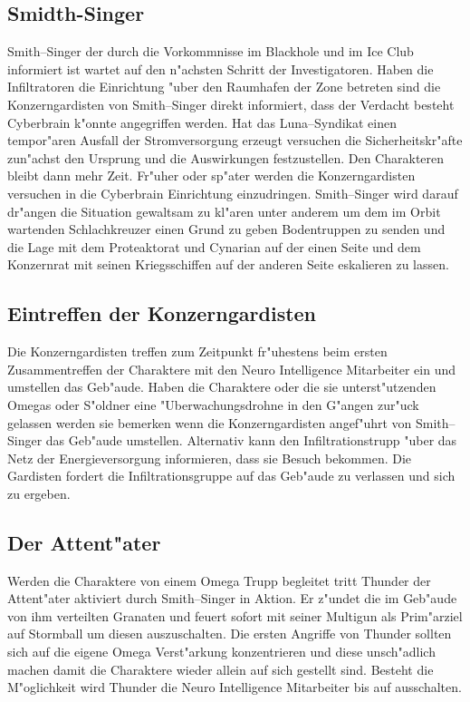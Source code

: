 \subsection{Smidth-Singer} 
Smith--Singer der durch die Vorkommnisse im Blackhole und im Ice Club informiert ist wartet auf den n"achsten Schritt der Investigatoren. Haben die Infiltratoren die Einrichtung "uber den Raumhafen der Zone betreten sind die Konzerngardisten von Smith--Singer direkt informiert, dass der Verdacht besteht Cyberbrain k"onnte angegriffen werden. Hat das Luna--Syndikat einen tempor"aren Ausfall der Stromversorgung erzeugt versuchen die Sicherheitskr"afte zun"achst den Ursprung und die Auswirkungen festzustellen. Den Charakteren bleibt dann mehr Zeit. Fr"uher oder sp"ater werden die Konzerngardisten versuchen in die Cyberbrain Einrichtung einzudringen. Smith--Singer wird darauf dr"angen die Situation gewaltsam zu kl"aren unter anderem um dem im Orbit wartenden Schlachkreuzer einen Grund zu geben Bodentruppen zu senden und die Lage mit dem Proteaktorat und Cynarian auf der einen Seite und dem Konzernrat mit seinen Kriegsschiffen auf der anderen Seite eskalieren zu lassen. 

\subsection{Eintreffen der Konzerngardisten} 
Die Konzerngardisten treffen zum Zeitpunkt fr"uhestens beim ersten Zusammentreffen der Charaktere mit den Neuro Intelligence Mitarbeiter ein und umstellen das Geb"aude. Haben die Charaktere oder die sie unterst"utzenden Omegas oder S"oldner eine "Uberwachungsdrohne in den G"angen zur"uck gelassen werden sie bemerken wenn die Konzerngardisten angef"uhrt von Smith--Singer das Geb"aude umstellen. Alternativ kann \xl{} den Infiltrationstrupp "uber das Netz der Energieversorgung informieren, dass sie Besuch bekommen. Die Gardisten fordert die Infiltrationsgruppe auf das Geb"aude zu verlassen und sich zu ergeben. 

\subsection{Der Attent"ater} 
Werden die Charaktere von einem Omega Trupp begleitet tritt Thunder der Attent"ater aktiviert durch 
Smith--Singer in Aktion. Er z"undet die im Geb"aude von ihm verteilten Granaten und feuert sofort mit seiner Multigun als Prim"arziel auf Stormball um diesen auszuschalten. Die ersten Angriffe von Thunder sollten sich auf die eigene Omega Verst"arkung konzentrieren und diese
unsch"adlich machen damit die Charaktere wieder allein auf sich gestellt sind. Besteht die M"oglichkeit wird Thunder die Neuro Intelligence Mitarbeiter bis auf \ml{} ausschalten.

